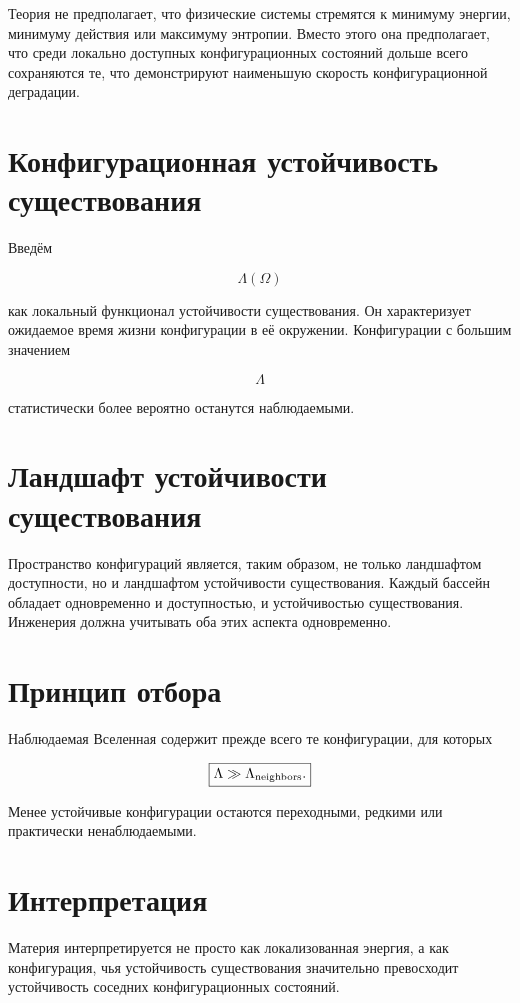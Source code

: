 Теория не предполагает, что физические системы стремятся к минимуму энергии, минимуму действия или максимуму энтропии. Вместо этого она предполагает, что среди локально доступных конфигурационных состояний дольше всего сохраняются те, что демонстрируют наименьшую скорость конфигурационной деградации.

\section{Конфигурационная устойчивость существования}

Введём

\[ \boxed{ \Lambda(\Omega) } \]

как локальный функционал устойчивости существования. Он характеризует ожидаемое время жизни конфигурации в её окружении. Конфигурации с большим значением

\[ \Lambda \]

статистически более вероятно останутся наблюдаемыми.

\section{Ландшафт устойчивости существования}

Пространство конфигураций является, таким образом, не только ландшафтом доступности, но и ландшафтом устойчивости существования. Каждый бассейн обладает одновременно и доступностью, и устойчивостью существования. Инженерия должна учитывать оба этих аспекта одновременно.

\section{Принцип отбора}

Наблюдаемая Вселенная содержит прежде всего те конфигурации, для которых

\[ \boxed{ \Lambda \gg \Lambda_{\rm neighbors}. } \]

Менее устойчивые конфигурации остаются переходными, редкими или практически ненаблюдаемыми.

\section{Интерпретация}

Материя интерпретируется не просто как локализованная энергия, а как конфигурация, чья устойчивость существования значительно превосходит устойчивость соседних конфигурационных состояний.

